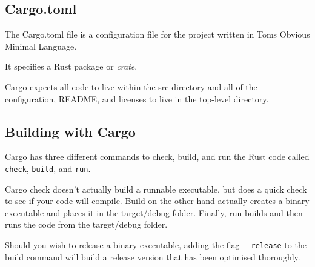\documentclass[12pt,notitlepage]{article}
\begin{document}
\subsection{Cargo.toml}

The Cargo.toml file is a configuration file for the project written in Toms
Obvious Minimal Language.

It specifies a Rust package or \emph{crate}.

Cargo expects all code to live within the src directory and all of the
configuration, README, and licenses to live in the top-level directory.

\subsection{Building with Cargo}

Cargo has three different commands to check, build, and run the Rust code
called \lstinline{check}, \lstinline{build}, and \lstinline{run}.

Cargo check doesn't actually build a runnable executable, but does a quick
check to see if your code will compile. Build on the other hand actually
creates a binary executable and places it in the target/debug folder. Finally,
run builds and then runs the code from the target/debug folder.

Should you wish to release a binary executable, adding the flag
\lstinline{--release} to the build command will build a release version that
has been optimised thoroughly.

\end{document}
